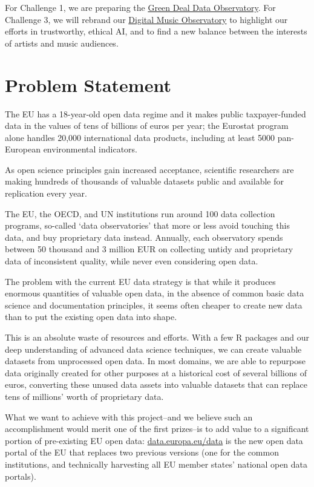 \documentclass[
  a4paper,
  openany, a4paper, oneside]{book}
\begin{document}
For Challenge 1, we are preparing the \href{http://greendeal.dataobservatory.eu/}{Green Deal Data Observatory}. For Challenge 3, we will rebrand our \href{https://music.dataobservatory.eu/}{Digital Music Observatory} to highlight our efforts in trustworthy, ethical AI, and to find a new balance between the interests of artists and music audiences.

\hypertarget{problem-statement}{%
\section*{Problem Statement}\label{problem-statement}}

The EU has a 18-year-old open data regime and it makes public taxpayer-funded data in the values of tens of billions of euros per year; the Eurostat program alone handles 20,000 international data products, including at least 5000 pan-European environmental indicators.

As open science principles gain increased acceptance, scientific researchers are making hundreds of thousands of valuable datasets public and available for replication every year.

The EU, the OECD, and UN institutions run around 100 data collection programs, so-called `data observatories' that more or less avoid touching this data, and buy proprietary data instead. Annually, each observatory spends between 50 thousand and 3 million EUR on collecting untidy and proprietary data of inconsistent quality, while never even considering open data.

The problem with the current EU data strategy is that while it produces enormous quantities of valuable open data, in the absence of common basic data science and documentation principles, it seems often cheaper to create new data than to put the existing open data into shape.

This is an absolute waste of resources and efforts. With a few R packages and our deep understanding of advanced data science techniques, we can create valuable datasets from unprocessed open data. In most domains, we are able to repurpose data originally created for other purposes at a historical cost of several billions of euros, converting these unused data assets into valuable datasets that can replace tens of millions' worth of proprietary data.

What we want to achieve with this project--and we believe such an accomplishment would merit one of the first prizes--is to add value to a significant portion of pre-existing EU open data:
\href{https://data.europa.eu/data/}{data.europa.eu/data} is the new open data portal of the EU that replaces two previous versions (one for the common institutions, and technically harvesting all EU member states' national open data portals).
\end{document}
